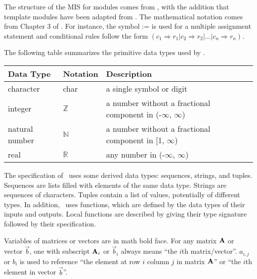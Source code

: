 \documentclass[12pt, titlepage]{article}
\begin{document}

The structure of the MIS for modules comes from \cite{HoffmanAndStrooper1995}, with
the addition that template modules have been adapted from \cite{GhezziEtAl2003}.
The mathematical notation comes from Chapter 3 of \cite{HoffmanAndStrooper1995}.
For instance, the symbol := is used for a multiple assignment statement and
conditional rules follow the form
$(c_1 \Rightarrow r_1 | c_2 \Rightarrow r_2 | ... | c_n \Rightarrow r_n )$.

The following table summarizes the primitive data types used by \progname.

\begin{center}
  \renewcommand{\arraystretch}{1.2}
  \noindent
  \begin{tabular}{l l p{7.5cm}}
    \toprule
    \textbf{Data Type}   & \textbf{Notation} & \textbf{Description}                                         \\
    \midrule
    character      & char        & a single symbol or digit                               \\
    integer        & $\mathbb{Z}$        & a number without a fractional component in (-$\infty$, $\infty$) \\
    natural number & $\mathbb{N}$        & a number without a fractional component in [1, $\infty$)    \\
    real           & $\mathbb{R}$        & any number in (-$\infty$, $\infty$)                              \\
    \bottomrule
  \end{tabular}
\end{center}

\noindent
The specification of \progname \ uses some derived data types: sequences, strings, and
tuples. Sequences are lists filled with elements of the same data type. Strings
are sequences of characters. Tuples contain a list of values, potentially of
different types. In addition, \progname \ uses functions, which
are defined by the data types of their inputs and outputs. Local functions are
described by giving their type signature followed by their specification.

Variables of matrices or vectors are in math bold face. For any matrix
\(\mathbf{A}\) or vector \(\vec{b}\), one with subscript \(\mathbf{A}_i\) or
\(\vec{b}_i\) always means ``the \(i\)th matrix/vector''. \(a_{i,j}\) or
\(b_{i}\) is used to reference ``the element at row \(i\) column \(j\) in matrix
\(\mathbf{A}\)'' or ``the \(i\)th element in vector \(\vec{b}\)''.
\end{document}
